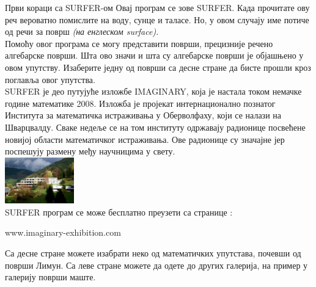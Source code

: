 \begin{surferIntroPage}{Први кораци са SURFER-ом}
Овај програм се зове SURFER. Када прочитате ову реч вероватно помислите на воду, сунце и таласе. Но, у овом случају име потиче од речи за површ {\it (на енглеском surface)}.
\\
Помоћу овог програма се могу представити површи, прецизније речено алгебарске површи. Шта ово значи и шта су алгебарске површи је објашњено у овом упутству. Изаберите једну од површи са десне стране да бисте прошли кроз поглавља овог упутства.\\
SURFER је део путујуће изложбе IMAGINARY, која је настала током немачке године математике 2008. Изложба је пројекат интернационално познатог Института за математичка истраживања у Оберволфаху, који се налази на Шварцвалду. Сваке недеље се на том институту одржавају радионице посвећене новијој области математичког истраживања. Ове радионице су значајне јер поспешују размену међу научницима у свету.  \\
\vspace{0.2cm} \hspace{3.5cm}\includegraphics[width=3cm]{./../../common/images/photo_mfo.jpg}\\
SURFER програм се може  бесплатно преузети са странице : \\
\begin{centering}
www.imaginary-exhibition.com\\
\end{centering}
 \vspace{0.2cm}
Са десне стране можете изабрати неко од математичких упутстава, почевши од површи Лимун. Са леве стране можете да одете до других галерија, на пример у галерију површи маште.
\end{surferIntroPage}
